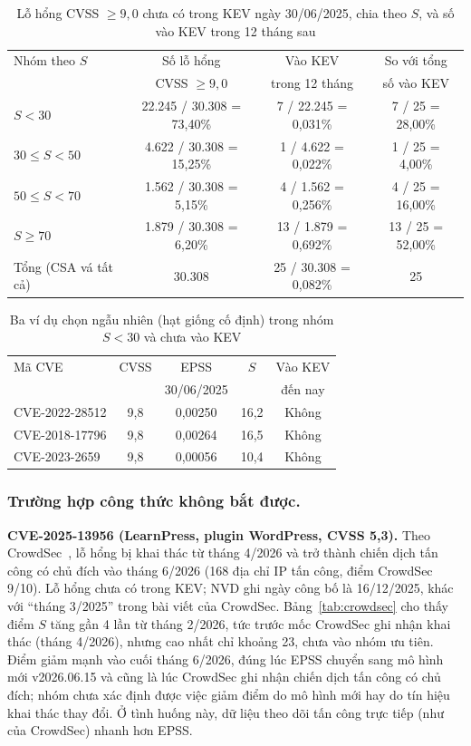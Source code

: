 \documentclass[runningheads]{llncs}
\begin{document}
\begin{table}
\centering
\caption{Lỗ hổng CVSS $\ge 9{,}0$ chưa có trong KEV ngày 30/06/2025, chia theo $S$, và số vào KEV trong 12 tháng sau}\label{tab:vathua}
\footnotesize
\setlength{\tabcolsep}{3pt}
\begin{tabular}{lccc}
\toprule
Nhóm theo $S$ & Số lỗ hổng & Vào KEV & So với tổng \\
 & CVSS $\ge 9{,}0$ & trong 12 tháng & số vào KEV \\
\midrule
$S < 30$ & 22.245 / 30.308 = 73,40\% & 7 / 22.245 = 0,031\% & 7 / 25 = 28,00\% \\
$30 \le S < 50$ & 4.622 / 30.308 = 15,25\% & 1 / 4.622 = 0,022\% & 1 / 25 = 4,00\% \\
$50 \le S < 70$ & 1.562 / 30.308 = 5,15\% & 4 / 1.562 = 0,256\% & 4 / 25 = 16,00\% \\
$S \ge 70$ & 1.879 / 30.308 = 6,20\% & 13 / 1.879 = 0,692\% & 13 / 25 = 52,00\% \\
\midrule
Tổng (CSA vá tất cả) & 30.308 & 25 / 30.308 = 0,082\% & 25 \\
\bottomrule
\end{tabular}
\end{table}

\begin{table}
\centering
\caption{Ba ví dụ chọn ngẫu nhiên (hạt giống cố định) trong nhóm $S < 30$ và chưa vào KEV}\label{tab:ngaunhien}
\small
\begin{tabular}{lcccc}
\toprule
Mã CVE & CVSS & EPSS & $S$ & Vào KEV \\
 & & 30/06/2025 & & đến nay \\
\midrule
CVE-2022-28512 & 9,8 & 0,00250 & 16,2 & Không \\
CVE-2018-17796 & 9,8 & 0,00264 & 16,5 & Không \\
CVE-2023-2659 & 9,8 & 0,00056 & 10,4 & Không \\
\bottomrule
\end{tabular}
\end{table}

\subsubsection{Trường hợp công thức không bắt được.}
\textbf{CVE-2025-13956 (LearnPress, plugin WordPress, CVSS 5,3).} Theo CrowdSec~\cite{crowdsec2026}, lỗ hổng bị khai thác từ tháng
4/2026 và trở thành chiến dịch tấn công có chủ đích vào tháng 6/2026 (168 địa chỉ IP tấn công, điểm CrowdSec
9/10). Lỗ hổng chưa có trong KEV; NVD ghi ngày công bố là 16/12/2025, khác với ``tháng 3/2025'' trong bài viết
của CrowdSec. Bảng~\ref{tab:crowdsec} cho thấy điểm $S$ tăng gần 4 lần từ tháng 2/2026, tức trước mốc CrowdSec ghi nhận khai thác (tháng 4/2026), nhưng cao nhất chỉ khoảng 23, chưa vào nhóm ưu tiên. Điểm giảm mạnh vào cuối tháng 6/2026, đúng lúc EPSS chuyển sang mô hình mới v2026.06.15 và cũng là lúc CrowdSec ghi nhận chiến dịch tấn công có chủ đích; nhóm chưa xác định được việc giảm điểm do mô hình mới hay do tín hiệu khai thác thay đổi. Ở tình huống này, dữ liệu theo dõi
tấn công trực tiếp (như của CrowdSec) nhanh hơn EPSS.
\end{document}
